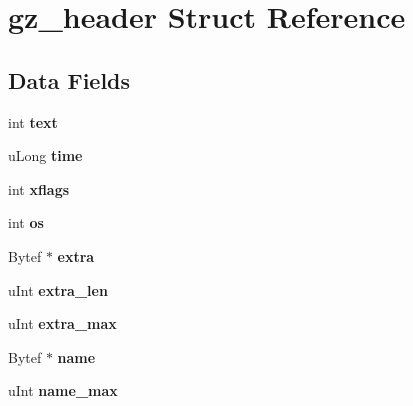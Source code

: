 \hypertarget{structgz__header}{\section{gz\-\_\-header Struct Reference}
\label{dc/d47/structgz__header}
}
\subsection*{Data Fields}
\begin{DoxyCompactItemize}
\item 
\hypertarget{structgz__header_a0f360ae15271478c63d71eeff3aadf61}{int {\bfseries text}}\label{dc/d47/structgz__header_a0f360ae15271478c63d71eeff3aadf61}

\item 
\hypertarget{structgz__header_af78d48bb737730209bdd4f408d7423ab}{u\-Long {\bfseries time}}\label{dc/d47/structgz__header_af78d48bb737730209bdd4f408d7423ab}

\item 
\hypertarget{structgz__header_aff725451a3584a5f1e37fcfb1beccd59}{int {\bfseries xflags}}\label{dc/d47/structgz__header_aff725451a3584a5f1e37fcfb1beccd59}

\item 
\hypertarget{structgz__header_a11efbbce191f03696d2773de0688945d}{int {\bfseries os}}\label{dc/d47/structgz__header_a11efbbce191f03696d2773de0688945d}

\item 
\hypertarget{structgz__header_ac5e2665487a2de750abf4058cb540b4c}{Bytef $\ast$ {\bfseries extra}}\label{dc/d47/structgz__header_ac5e2665487a2de750abf4058cb540b4c}

\item 
\hypertarget{structgz__header_ab16f7081fb292374b007651899c61fc6}{u\-Int {\bfseries extra\-\_\-len}}\label{dc/d47/structgz__header_ab16f7081fb292374b007651899c61fc6}

\item 
\hypertarget{structgz__header_a15ed037e60f245bea1edb697b25630a4}{u\-Int {\bfseries extra\-\_\-max}}\label{dc/d47/structgz__header_a15ed037e60f245bea1edb697b25630a4}

\item 
\hypertarget{structgz__header_a6590a8fcdb4bcf458256f7a9fc3e9c32}{Bytef $\ast$ {\bfseries name}}\label{dc/d47/structgz__header_a6590a8fcdb4bcf458256f7a9fc3e9c32}

\item 
\hypertarget{structgz__header_ac58c21e1f423d0215aa7769c3713ac61}{u\-Int {\bfseries name\-\_\-max}}\label{dc/d47/structgz__header_ac58c21e1f423d0215aa7769c3713ac61}


\end{DoxyCompactItemize}
